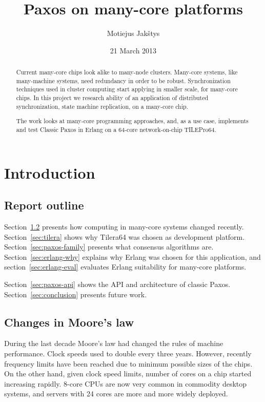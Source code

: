\documentclass[english,11pt]{l4proj}
\begin{document}
\title{Paxos on many-core platforms}
\author{Motiejus Jakštys}
\date{21 March 2013}

\maketitle

\begin{abstract}

Current many-core chips look alike to many-node clusters. Many-core systems,
like many-machine systems, need redundancy in order to be robust.
Synchronization techniques used in cluster computing start applying in smaller
scale, for many-core chips. In this project we research ability of an
application of distributed synchronization, state machine replication, on a
many-core chip.

The work looks at many-core programming approaches, and, as a use case,
implements and test Classic Paxos in Erlang on a 64-core network-on-chip
TILEPro64.

\end{abstract}

\tableofcontents
\pagebreak

\section{Introduction}

\subsection{Report outline}

Section~\ref{sec:many-core} presents how computing in many-core systems changed
recently. Section~\ref{sec:tilera} shows why Tilera64 was chosen as development
platform. Section~\ref{sec:paxos-family} presents what consensus algorithms are.
Section~\ref{sec:erlang-why} explains why Erlang was chosen for this
application, and section~\ref{sec:erlang-eval} evaluates Erlang suitability for
many-core platforms.

Section~\ref{sec:paxos-api} shows the API and architecture of classic Paxos.
Section~\ref{sec:conclusion} presents future work.

\subsection{Changes in Moore's law}
\label{sec:many-core}

During the last decade Moore's law had changed the rules of machine performance.
Clock speeds used to double every three years. However, recently frequency
limits have been reached due to minimum possible sizes of the chips. On the
other hand, given clock speed limits, number of cores on a chip started
increasing rapidly. 8-core CPUs are now very common in commodity desktop
systems, and servers with 24 cores are more and more widely deployed.
\end{document}
